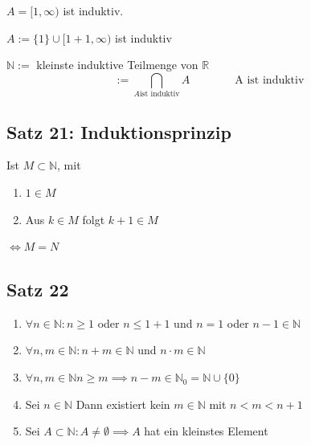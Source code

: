 \documentclass[fleqn]{scrbook}
\newenvironment{example}{{\bfseries Beispiel }}{}
\begin{document}
\begin{example}

$A= [1,\infty)$ ist induktiv.

$A:= \{1\} \cup [1+1,\infty)$ ist induktiv
\end{example}

$\mathbb{N}:=$ kleinste induktive Teilmenge von $\mathbb{R}$
\[:= \bigcap_{A \text{ist induktiv}} A \qquad\qquad \text{A ist induktiv}\]

\subsection{Satz 21: Induktionsprinzip}

Ist $M \subset \mathbb{N}$, mit 

\begin{enumerate}
  \item $1 \in M$
  \item Aus $k \in M$ folgt $k+1 \in M$
\end{enumerate}

$\Longleftrightarrow M = N$

\subsection{Satz 22}
\begin{enumerate}[1)]
\item $\forall n \in \mathbb{N}: n \geq 1$ oder $n \leq 1 + 1$ und $n = 1$ oder $n-1 \in \mathbb{N}$
\item $\forall n,m \in \mathbb{N}: n+m \in \mathbb{N}$ und $n \cdot m \in \mathbb{N}$
\item $\forall n,m \in \mathbb{N} n \geq m \implies n-m \in \mathbb{N}_0 = \mathbb{N} \cup \{0\}$
\item Sei $n \in \mathbb{N}$ Dann existiert kein $m \in \mathbb{N}$ mit $n < m < n+1$
\item Sei $A \subset \mathbb{N}: A \neq \emptyset \implies A$ hat ein kleinstes Element
\end{enumerate}
\end{document}

